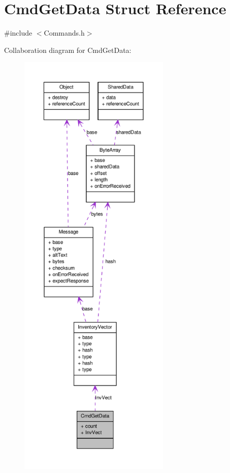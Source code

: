 \hypertarget{struct_cmd_get_data}{
\section{CmdGetData Struct Reference}
\label{struct_cmd_get_data}
}


{\ttfamily \#include $<$Commands.h$>$}



Collaboration diagram for CmdGetData:
\nopagebreak
\begin{figure}[H]
\begin{center}
\leavevmode
\includegraphics[height=600pt]{struct_cmd_get_data__coll__graph}
\end{center}
\end{figure}
